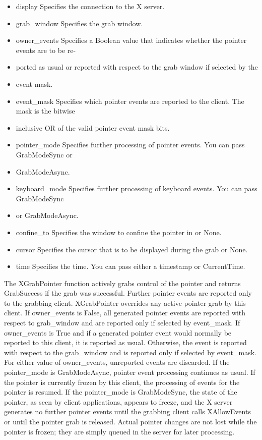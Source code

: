 \documentclass{report}
\begin{document}
\begin{itemize}
\begin{itemize}
                \item display Specifies the connection to the X server.
                \item grab\_window Specifies the grab window.
                \item owner\_events Specifies a Boolean value that indicates whether the pointer events are to be re-
                \item ported as usual or reported with respect to the grab window if selected by the
                \item event mask.
                \item event\_mask Specifies which pointer events are reported to the client. The mask is the bitwise
                \item inclusive OR of the valid pointer event mask bits.
                \item pointer\_mode Specifies further processing of pointer events. You can pass GrabModeSync or
                \item GrabModeAsync.
                \item keyboard\_mode Specifies further processing of keyboard events. You can pass GrabModeSync
                \item or GrabModeAsync.
                \item confine\_to Specifies the window to confine the pointer in or None.
                \item cursor Specifies the cursor that is to be displayed during the grab or None.
                \item time Specifies the time. You can pass either a timestamp or CurrentTime.
            \end{itemize}
            The XGrabPointer function actively grabs control of the pointer and returns GrabSuccess if the grab was successful. Further pointer events are reported only to the grabbing client. XGrabPointer overrides any active pointer grab by this client. If owner\_events is False, all generated pointer events are reported with respect to grab\_window and are reported only if selected by event\_mask. If owner\_events is True and if a generated pointer event would normally be reported to this client, it is reported as usual. Otherwise, the event is reported with respect to the grab\_window and is reported only if selected by event\_mask. For either value of owner\_events, unreported events are discarded.
            \bigbreak \noindent 
            If the pointer\_mode is GrabModeAsync, pointer event processing continues as usual. If the pointer is currently frozen by this client, the processing of events for the pointer is resumed. If the pointer\_mode is GrabModeSync, the state of the pointer, as seen by client applications, appears to freeze, and the X server generates no further pointer events until the grabbing client calls XAllowEvents or until the pointer grab is released. Actual pointer changes are not lost while the pointer is frozen; they are simply queued in the server for later processing.

\end{itemize}
\end{document}
